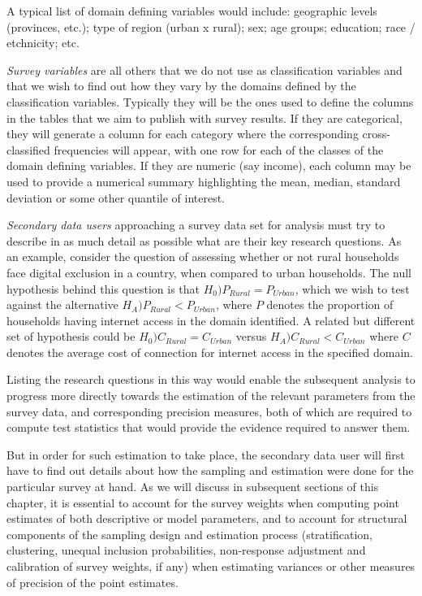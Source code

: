 \documentclass[
  12pt,
]{book}
\begin{document}
A typical list of domain defining variables would include: geographic levels (provinces, etc.); type of region (urban x rural); sex; age groups; education; race / etchnicity; etc.

\emph{Survey variables} are all others that we do not use as classification variables and that we wish to find out how they vary by the domains defined by the classification variables. Typically they will be the ones used to define the columns in the tables that we aim to publish with survey results. If they are categorical, they will generate a column for each category where the corresponding cross-classified frequencies will appear, with one row for each of the classes of the domain defining variables. If they are numeric (say income), each column may be used to provide a numerical summary highlighting the mean, median, standard deviation or some other quantile of interest.

\emph{Secondary data users} approaching a survey data set for analysis must try to describe in as much detail as possible what are their key research questions. As an example, consider the question of assessing whether or not rural households face digital exclusion in a country, when compared to urban households. The null hypothesis behind this question is that \(H_0) P_{Rural} = P_{Urban}\), which we wish to test against the alternative \(H_A) P_{Rural} < P_{Urban}\), where \(P\) denotes the proportion of households having internet access in the domain identified. A related but different set of hypothesis could be \(H_0) C_{Rural} = C_{Urban}\) versus \(H_A) C_{Rural} < C_{Urban}\) where \(C\) denotes the average cost of connection for internet access in the specified domain.

Listing the research questions in this way would enable the subsequent analysis to progress more directly towards the estimation of the relevant parameters from the survey data, and corresponding precision measures, both of which are required to compute test statistics that would provide the evidence required to answer them.

But in order for such estimation to take place, the secondary data user will first have to find out details about how the sampling and estimation were done for the particular survey at hand. As we will discuss in subsequent sections of this chapter, it is essential to account for the survey weights when computing point estimates of both descriptive or model parameters, and to account for structural components of the sampling design and estimation process (stratification, clustering, unequal inclusion probabilities, non-response adjustment and calibration of survey weights, if any) when estimating variances or other measures of precision of the point estimates.
\end{document}

